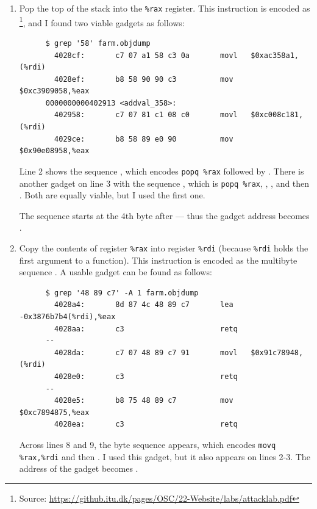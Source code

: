 \begin{enumerate}
  \item Pop the top of the stack into the \texttt{\%rax} register. This instruction is encoded as \footnote{Source: \url{https://github.itu.dk/pages/OSC/22-Website/labs/attacklab.pdf}}, and I found two viable gadgets as follows:
    \begin{verbatim}
      $ grep '58' farm.objdump
        4028cf:       c7 07 a1 58 c3 0a       movl   $0xac358a1,(%rdi)
        4028ef:       b8 58 90 90 c3          mov    $0xc3909058,%eax
      0000000000402913 <addval_358>:
        402958:       c7 07 81 c1 08 c0       movl   $0xc008c181,(%rdi)
        4029ce:       b8 58 89 e0 90          mov    $0x90e08958,%eax
    \end{verbatim}
    Line 2 shows the sequence , which encodes \texttt{popq \%rax} followed by . There is another gadget on line 3 with the sequence , which is \texttt{popq \%rax}, , , and then . Both are equally viable, but I used the first one.

    The  sequence starts at the 4th byte after  --- thus the gadget address becomes .

  \item Copy the contents of register \texttt{\%rax} into register \texttt{\%rdi} (because \texttt{\%rdi} holds the first argument to a function). This instruction is encoded as the multibyte sequence . A usable gadget can be found as follows:

    \begin{verbatim}
      $ grep '48 89 c7' -A 1 farm.objdump
        4028a4:       8d 87 4c 48 89 c7       lea    -0x3876b7b4(%rdi),%eax
        4028aa:       c3                      retq
      --
        4028da:       c7 07 48 89 c7 91       movl   $0x91c78948,(%rdi)
        4028e0:       c3                      retq
      --
        4028e5:       b8 75 48 89 c7          mov    $0xc7894875,%eax
        4028ea:       c3                      retq
    \end{verbatim}

    Across lines 8 and 9, the byte sequence  appears, which encodes \texttt{movq \%rax,\%rdi} and then . I used this gadget, but it also appears on lines 2-3. The address of the gadget becomes .
\end{enumerate}


